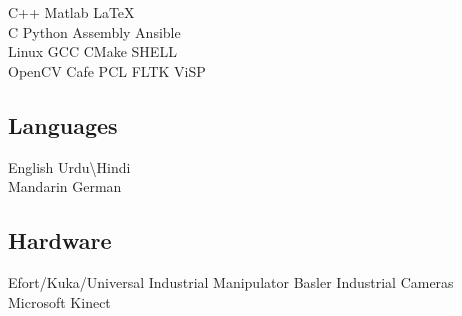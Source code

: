 \documentclass[a4paper]{deedy-resume} %
\begin{document}
\begin{minipage}[t]{0.33\textwidth}
C++ \textbullet{} Matlab \textbullet{} \LaTeX \\
C \textbullet{} Python \textbullet{} Assembly \textbullet{} Ansible \\
Linux \textbullet{} GCC \textbullet{} CMake \textbullet{} SHELL \\
OpenCV \textbullet{} Cafe \textbullet{} PCL \textbullet{} FLTK \textbullet{} ViSP \\

\vspace{\topsep} %

\subsection{Languages}
English \textbullet{} Urdu\textbackslash Hindi \\
Mandarin \textbullet {} German

\vspace{\topsep} %

\subsection{Hardware}
Efort/Kuka/Universal Industrial Manipulator \textbullet{} Basler Industrial Cameras \textbullet{} Microsoft Kinect \\

\end{minipage}
\end{document}
